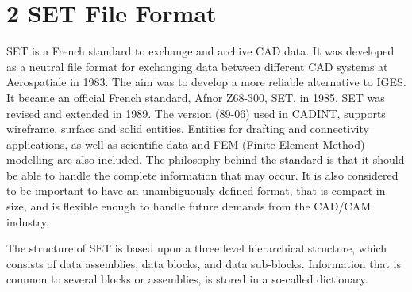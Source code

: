 \section*{2 SET File Format}
 
 
SET is a French standard
to exchange and archive CAD data.  It was developed as a neutral file format for
exchanging data between different CAD systems at Aerospatiale in 1983.
The aim was to develop
a more reliable alternative to IGES.  It became an official
French standard,
Afnor Z68-300, SET, in 1985.  SET was revised and extended in 1989.  The
version (89-06) used in CADINT, supports wireframe, surface and solid entities.
Entities for drafting and connectivity applications, as well as scientific
data and FEM (Finite Element Method) modelling are also included.
The philosophy behind the standard is that it should be able to
handle the complete information that may occur.
It is also considered to be important to have an unambiguously defined format,
that is compact in size,
and is flexible enough to handle future demands from the CAD/CAM industry.
 
 
The structure of SET is based upon a three level hierarchical structure,
which consists of data assemblies, data blocks, and data sub-blocks.
Information that is common to several blocks or assemblies, is stored in a
so-called dictionary.
 
